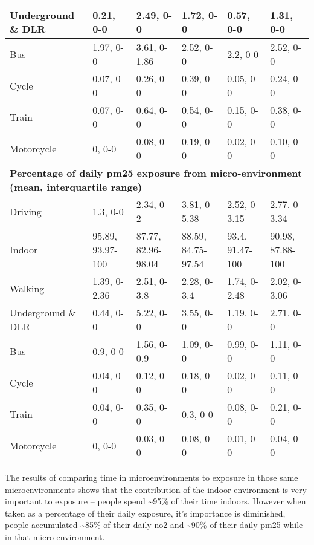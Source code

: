 \begin{landscape}
\begin{table}[H]
\begin{tabular}{ | p{3.5cm} | p{3.3cm} | p{3.9cm} | p{3.3cm} | p{3.1cm} | p{3.1cm} |}
     Underground \& DLR & 0.21, 0-0 & 2.49, 0-0 & 1.72, 0-0 & 0.57, 0-0 & 1.31, 0-0 \\ \hline
     Bus & 1.97, 0-0 & 3.61, 0-1.86 & 2.52, 0-0 & 2.2, 0-0 & 2.52, 0-0 \\ \hline
     Cycle & 0.07, 0-0  & 0.26, 0-0 & 0.39, 0-0 & 0.05, 0-0 & 0.24, 0-0 \\ \hline
     Train & 0.07, 0-0 & 0.64, 0-0 & 0.54, 0-0 & 0.15, 0-0 & 0.38, 0-0  \\ \hline
     Motorcycle & 0, 0-0 & 0.08, 0-0 & 0.19, 0-0 & 0.02, 0-0 & 0.10, 0-0 \\ \hline
     \multicolumn{6}{|l|}{\bfseries{Percentage of daily \gls{pm25} exposure from micro-environment (mean, interquartile range)}} \\ \hline
     Driving & 1.3, 0-0 & 2.34, 0-2 & 3.81, 0-5.38 & 2.52, 0-3.15 & 2.77. 0-3.34 \\ \hline
     Indoor & 95.89, 93.97-100 & 87.77, 82.96-98.04 & 88.59, 84.75-97.54 & 93.4, 91.47-100 & 90.98, 87.88-100 \\ \hline
     Walking & 1.39, 0-2.36 & 2.51, 0-3.8 & 2.28, 0-3.4 & 1.74, 0-2.48 & 2.02, 0-3.06 \\ \hline
     Underground \& DLR & 0.44, 0-0 & 5.22, 0-0 & 3.55, 0-0 & 1.19, 0-0 & 2.71, 0-0 \\ \hline
     Bus & 0.9, 0-0 & 1.56, 0-0.9 & 1.09, 0-0 & 0.99, 0-0 & 1.11, 0-0 \\ \hline
     Cycle & 0.04, 0-0 & 0.12, 0-0 & 0.18, 0-0 & 0.02, 0-0 & 0.11, 0-0 \\ \hline
     Train & 0.04, 0-0 & 0.35, 0-0 & 0.3, 0-0 & 0.08, 0-0 & 0.21, 0-0 \\ \hline
     Motorcycle & 0, 0-0 & 0.03, 0-0 & 0.08, 0-0 & 0.01, 0-0 & 0.04, 0-0 \\ \hline
    \end{tabular}
\label{tab:results_microenvironments_exposure}
\end{table}

\end{landscape}

\restoregeometry

The results of comparing time in microenvironments to exposure in those same microenvironments shows that the contribution of the indoor environment is very important to exposure -- people spend \textasciitilde95\% of their time indoors. However when taken as a percentage of their daily exposure, it's importance is diminished, people accumulated \textasciitilde85\% of their daily \gls{no2} and \textasciitilde90\% of their daily \gls{pm25} while in that micro-environment.

